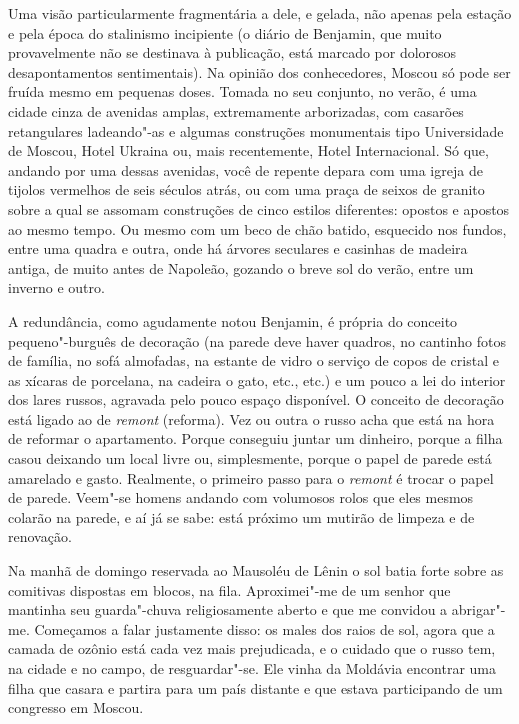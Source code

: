 Uma visão particularmente fragmentária a dele, e gelada, não apenas pela estação e pela época do stalinismo incipiente (o diário de Benjamin, que muito provavelmente não se destinava à publicação, está marcado por dolorosos desapontamentos sentimentais). Na opinião dos conhecedores, Moscou só pode ser fruída mesmo em pequenas doses. Tomada no seu conjunto, no verão, é uma cidade cinza de avenidas amplas, extremamente arborizadas, com casarões retangulares ladeando"-as e algumas construções monumentais tipo Universidade de Moscou, Hotel Ukraina ou, mais recentemente, Hotel Internacional. Só que, andando por uma dessas avenidas, você de repente depara com uma igreja de tijolos vermelhos de seis séculos atrás, ou com uma praça de seixos de granito sobre a qual se assomam construções de cinco estilos diferentes: opostos e apostos ao mesmo tempo. Ou mesmo com um beco de chão batido, esquecido
nos fundos, entre uma quadra e outra, onde há árvores seculares e casinhas de madeira antiga, de muito antes de Napoleão, gozando o breve sol do verão, entre um inverno e outro.

A redundância, como agudamente notou Benjamin, é própria do conceito pequeno"-burguês de decoração (na parede deve haver quadros, no cantinho fotos de família, no sofá almofadas, na estante de vidro o serviço de copos de cristal e as xícaras de porcelana, na cadeira o gato, etc., etc.) e um pouco a lei do interior dos lares russos, agravada pelo pouco espaço disponível. O conceito de decoração está ligado ao de \emph{remont} (reforma). Vez ou outra o russo acha que está na hora de reformar o apartamento. Porque conseguiu juntar um dinheiro, porque a filha casou deixando um local livre ou, simplesmente, porque o papel de parede está amarelado e gasto. Realmente, o primeiro passo para o \emph{remont} é trocar o papel de parede. Veem"-se homens andando com volumosos rolos que eles mesmos colarão na parede, e aí já se sabe: está próximo um mutirão de limpeza e de renovação.

Na manhã de domingo reservada ao Mausoléu de Lênin o sol batia forte sobre as comitivas dispostas em blocos, na fila. Aproximei"-me de um senhor que mantinha seu guarda"-chuva religiosamente aberto e que me convidou a abrigar"-me. Começamos a falar justamente disso: os males dos raios de sol, agora que a camada de ozônio está cada vez mais prejudicada, e o cuidado que o russo tem, na cidade e no campo, de resguardar"-se. Ele vinha da Moldávia encontrar uma filha que casara e partira para um país distante e que estava participando de um congresso em Moscou.

